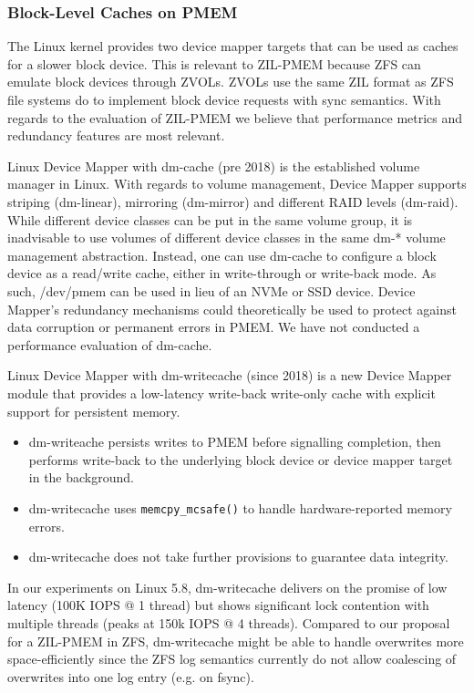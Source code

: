 \documentclass[12pt,a4paper,twoside,draft]{book}
\begin{document}
\subsubsection{ Block-Level Caches on PMEM}
The Linux kernel provides two device mapper targets that can be used as caches for a slower block device.
This is relevant to ZIL-PMEM because ZFS can emulate block devices through ZVOLs.
ZVOLs use the same ZIL format as ZFS file systems do to implement block device requests with sync semantics.
With regards to the evaluation of ZIL-PMEM we believe that performance metrics and redundancy features are most relevant.

Linux Device Mapper with dm-cache (pre 2018) is the established volume manager in Linux.
With regards to volume management, Device Mapper supports striping (dm-linear), mirroring (dm-mirror) and different RAID levels (dm-raid).
While different device classes can be put in the same volume group, it is inadvisable to use volumes of different device classes in the same dm-* volume management abstraction.
Instead, one can use dm-cache to configure a block device as a read/write cache, either in write-through or write-back mode.
As such, /dev/pmem can be used in lieu of an NVMe or SSD device.
Device Mapper’s redundancy mechanisms could theoretically be used to protect against data corruption or permanent errors in PMEM.
We have not conducted a performance evaluation of dm-cache.

Linux Device Mapper with dm-writecache (since 2018) is a new Device Mapper module that provides a low-latency write-back write-only cache with explicit support for persistent memory.
\begin{itemize}
    \item dm-writeache persists writes to PMEM before signalling completion, then performs write-back to the underlying block device or device mapper target in the background.
    \item dm-writecache uses \lstinline{memcpy_mcsafe()} to handle hardware-reported memory errors.
    \item dm-writecache does not take further provisions to guarantee data integrity.
\end{itemize}
In our experiments on Linux 5.8, dm-writecache delivers on the promise of low latency (100K IOPS @ 1 thread) but shows significant lock contention with multiple threads (peaks at 150k IOPS @ 4 threads).
Compared to our proposal for a ZIL-PMEM in ZFS, dm-writecache might be able to handle overwrites more space-efficiently since the ZFS log semantics currently do not allow coalescing of overwrites into one log entry (e.g. on fsync).
\end{document}
